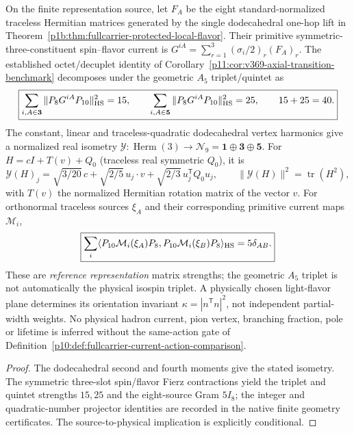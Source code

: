 \documentclass[12pt,a4paper]{article}
\begin{document}
\begin{proposition}
\label{p11:prop:fullcarrier-geometric-flavor-source-crosswalk}
On the finite representation source, let $F_A$ be the eight
standard-normalized traceless Hermitian matrices generated by the
single dodecahedral one-hop lift in
Theorem~\ref{p1b:thm:fullcarrier-protected-local-flavor}.
Their primitive symmetric-three-constituent spin--flavor current is
$G^{iA}=\sum_{r=1}^3(\sigma_i/2)_r(F_A)_r$.
The established octet/decuplet identity of
Corollary~\ref{p11:cor:v369-axial-transition-benchmark} decomposes
under the geometric $A_5$ triplet/quintet as
\[
 \boxed{\sum_{i,A\in\mathbf3}\|P_8G^{iA}P_{10}\|_{\rm HS}^2=15,
 \qquad\sum_{i,A\in\mathbf5}\|P_8G^{iA}P_{10}\|_{\rm HS}^2=25,
 \qquad 15+25=40.}
\]
The constant, linear and traceless-quadratic dodecahedral vertex
harmonics give a normalized real isometry
$\mathcal Y:\operatorname{Herm}(3)\to
\mathcal N_9=\mathbf1\oplus\mathbf3\oplus\mathbf5$.
For $H=cI+T(v)+Q_0$ (traceless real symmetric $Q_0$), it is
\[
 \mathcal Y(H)_j=\sqrt{3/20}\,c
 +\sqrt{2/5}\,u_j\cdot v
 +\sqrt{2/3}\,u_j^{\mathsf T}Q_0u_j,
 \qquad\|\mathcal Y(H)\|^2=\operatorname{tr}(H^2),
\]
with $T(v)$ the normalized Hermitian rotation matrix of the
vector $v$.  For orthonormal traceless sources $\xi_A$ and their
corresponding primitive current maps $\mathcal M_i$,
\[
 \boxed{\sum_i\langle P_{10}\mathcal M_i(\xi_A)P_8,
 P_{10}\mathcal M_i(\xi_B)P_8\rangle_{\rm HS}=5\delta_{AB}.}
\]
These are \emph{reference representation} matrix strengths; the
geometric $A_5$ triplet is not automatically the physical isospin
triplet.  A physically chosen light-flavor plane determines its
orientation invariant $\kappa=|n^{\mathsf T}n|^2$, not independent
partial-width weights.  No physical hadron current, pion vertex,
branching fraction, pole or lifetime is inferred without the
same-action gate of Definition~\ref{p10:def:fullcarrier-current-action-comparison}.
\end{proposition}
\begin{proof}
The dodecahedral second and fourth moments give the stated isometry.
The symmetric three-slot spin/flavor Fierz contractions yield the
triplet and quintet strengths $15,25$ and the eight-source Gram
$5I_8$; the integer and quadratic-number projector identities
are recorded in the native finite geometry certificates.  The
source-to-physical implication is explicitly conditional.
\end{proof}
\end{document}
